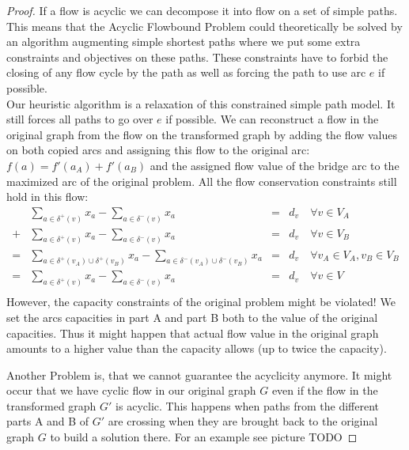 \begin{proof}
 If a flow is acyclic we can decompose it into flow on a set of simple paths. This means that the 
Acyclic Flowbound Problem could theoretically be solved by an algorithm augmenting simple shortest paths where we put 
some extra constraints and objectives on these paths. These constraints have to forbid the closing of any flow cycle by 
the path as well as forcing the path to use arc $e$ if possible. \\ %

Our heuristic algorithm is a relaxation of this constrained simple path model. It still forces all paths to go 
over $e$ if possible. 
We can reconstruct a flow in the original graph from the flow on the transformed graph by adding the flow values on 
both copied arcs and assigning this flow to the original arc: $f(a)=f'(a_A)+f'(a_B)$ and the assigned flow value of the 
bridge arc to the maximized arc of the original problem. All the flow conservation constraints still hold in this flow:
\begin{align*}
& \sum_{a\in \delta^+(v)}x_a - \sum_{a\in\delta^- (v)}x_a &=& d_v\ &\forall v\in V_A \\
+& \sum_{a\in \delta^+(v)}x_a - \sum_{a\in\delta^- (v)}x_a &=& d_v\ &\forall v\in V_B \\
=& \sum_{a\in \delta^+(v_A)\cup\delta^+(v_B)}x_a - \sum_{a\in\delta^- (v_A)\cup\delta^-(v_B)}x_a &=& d_v\ &\forall 
v_A\in V_A, v_B\in V_B \\
=& \sum_{a\in \delta^+(v)}x_a - \sum_{a\in\delta^- (v)}x_a &=& d_v\ &\forall v\in V \\
\end{align*}
However, the capacity constraints of the original problem might be violated! We set the arcs capacities in part A and 
part B both to the value of the original capacities. Thus it might happen that actual flow value in the original graph 
amounts to a higher value than the capacity allows (up to twice the capacity). 

Another Problem is, that we cannot guarantee the acyclicity anymore. It might occur that we have cyclic flow in our 
original graph $G$ even if the flow in the transformed graph $G'$ is acyclic. This happens when paths from 
the different parts A and B of $G'$ are crossing when they are brought back to the original graph $G$ to 
build a solution there. For an example see picture TODO


\end{proof}

